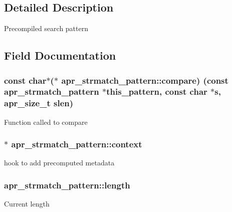 \subsection{Detailed Description}
Precompiled search pattern 

\subsection{Field Documentation}
\subsubsection[{\texorpdfstring{compare}{compare}}]{\setlength{\rightskip}{0pt plus 5cm}const char$\ast$($\ast$ apr\+\_\+strmatch\+\_\+pattern\+::compare) (const {\bf apr\+\_\+strmatch\+\_\+pattern} $\ast$this\+\_\+pattern, const char $\ast${\bf s}, {\bf apr\+\_\+size\+\_\+t} {\bf slen})}\hypertarget{structapr__strmatch__pattern_aded054f3d6701a163816e3ed7f257242}{}\label{structapr__strmatch__pattern_aded054f3d6701a163816e3ed7f257242}
Function called to compare 
\subsubsection[{\texorpdfstring{context}{context}}]{$\ast$ apr\+\_\+strmatch\+\_\+pattern\+::context}\hypertarget{structapr__strmatch__pattern_a0e74c401e8825e462e202175bf033a9c}{}\label{structapr__strmatch__pattern_a0e74c401e8825e462e202175bf033a9c}
hook to add precomputed metadata 
\subsubsection[{\texorpdfstring{length}{length}}]{ apr\+\_\+strmatch\+\_\+pattern\+::length}\hypertarget{structapr__strmatch__pattern_a4b1f44db089850f396bc4bedac0fb25c}{}\label{structapr__strmatch__pattern_a4b1f44db089850f396bc4bedac0fb25c}
Current length 

